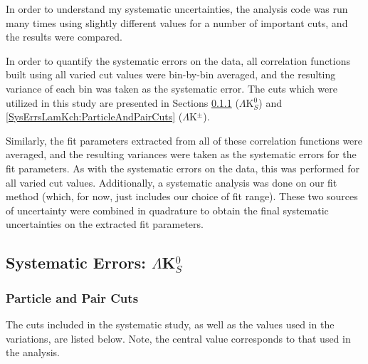 \documentclass[ALICE,manyauthors]{cernphprep}
\begin{document}
In order to understand my systematic uncertainties, the analysis code was run many times using slightly different values for a number of important cuts, and the results were compared.

In order to quantify the systematic errors on the data, all correlation functions built using all varied cut values were bin-by-bin averaged, and the resulting variance of each bin was taken as the systematic error.  The cuts which were utilized in this study are presented in Sections \ref{SysErrsLamK0:ParticleAndPairCuts} ($\Lambda$K$^{0}_{S}$) and \ref{SysErrsLamKch:ParticleAndPairCuts} ($\Lambda$K$^{\pm}$).


Similarly, the fit parameters extracted from all of these correlation functions were averaged, and the resulting variances were taken as the systematic errors for the fit parameters.
As with the systematic errors on the data, this was performed for all varied cut values.
Additionally, a systematic analysis was done on our fit method (which, for now, just includes our choice of fit range).
These two sources of uncertainty were combined in quadrature to obtain the final systematic uncertainties on the extracted fit parameters.



\subsection{Systematic Errors: \texorpdfstring{$\Lambda$K$^{0}_{S}$}{TEXT}}
\label{SysErrsLamK0}

\subsubsection{Particle and Pair Cuts}
\label{SysErrsLamK0:ParticleAndPairCuts}

The cuts included in the systematic study, as well as the values used in the variations, are listed below.  Note, the central value corresponds to that used in the analysis.
\end{document}
